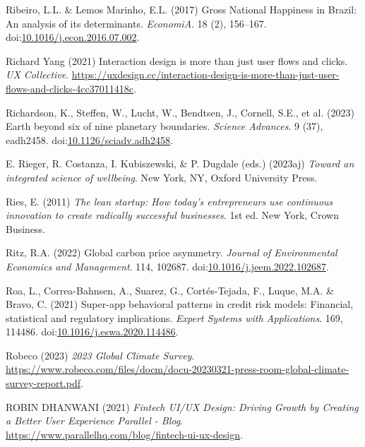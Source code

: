 \documentclass[
  letterpaper,
  DIV=11,
  numbers=noendperiod]{scrartcl}
\newlength{\cslhangindent}
\newenvironment{CSLReferences}[2] %
 {\begin{list}{}{%
  \setlength{\itemindent}{0pt}
  \setlength{\leftmargin}{0pt}
  \setlength{\parsep}{0pt}
  \ifodd #1
   \setlength{\leftmargin}{\cslhangindent}
   \setlength{\itemindent}{-1\cslhangindent}
  \fi
  \setlength{\itemsep}{#2\baselineskip}}}
 {\end{list}}
\begin{document}
\begin{CSLReferences}{0}{1}
Ribeiro, L.L. \& Lemos Marinho, E.L. (2017) Gross {National Happiness}
in {Brazil}: {An} analysis of its determinants. \emph{EconomiA}. 18 (2),
156--167.
doi:\href{https://doi.org/10.1016/j.econ.2016.07.002}{10.1016/j.econ.2016.07.002}.

Richard Yang (2021) Interaction design is more than just user flows and
clicks. \emph{UX Collective}.
\url{https://uxdesign.cc/interaction-design-is-more-than-just-user-flows-and-clicks-4cc37011418c}.

Richardson, K., Steffen, W., Lucht, W., Bendtsen, J., Cornell, S.E., et
al. (2023) Earth beyond six of nine planetary boundaries. \emph{Science
Advances}. 9 (37), eadh2458.
doi:\href{https://doi.org/10.1126/sciadv.adh2458}{10.1126/sciadv.adh2458}.

E. Rieger, R. Costanza, I. Kubiszewski, \& P. Dugdale (eds.) (2023aj)
\emph{Toward an integrated science of wellbeing}. New York, NY, Oxford
University Press.

Ries, E. (2011) \emph{The lean startup: How today's entrepreneurs use
continuous innovation to create radically successful businesses}. 1st
ed. New York, Crown Business.

Ritz, R.A. (2022) Global carbon price asymmetry. \emph{Journal of
Environmental Economics and Management}. 114, 102687.
doi:\href{https://doi.org/10.1016/j.jeem.2022.102687}{10.1016/j.jeem.2022.102687}.

Roa, L., Correa-Bahnsen, A., Suarez, G., Cortés-Tejada, F., Luque, M.A.
\& Bravo, C. (2021) Super-app behavioral patterns in credit risk models:
{Financial}, statistical and regulatory implications. \emph{Expert
Systems with Applications}. 169, 114486.
doi:\href{https://doi.org/10.1016/j.eswa.2020.114486}{10.1016/j.eswa.2020.114486}.

Robeco (2023) \emph{2023 {Global Climate Survey}}.
\url{https://www.robeco.com/files/docm/docu-20230321-press-room-global-climate-survey-report.pdf}.

ROBIN DHANWANI (2021) \emph{Fintech {UI}/{UX Design}: {Driving Growth}
by {Creating} a {Better User Experience} {\textbar} {Parallel} -
{Blog}}. \url{https://www.parallelhq.com/blog/fintech-ui-ux-design}.


\end{CSLReferences}
\end{document}
